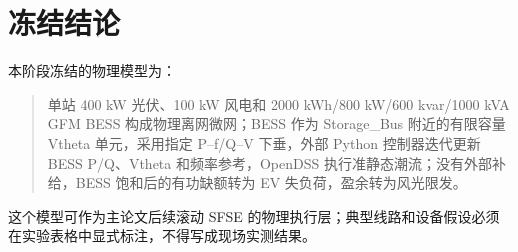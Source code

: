 \documentclass[UTF8,a4paper,11pt]{ctexart}
\begin{document}
\section{冻结结论}

本阶段冻结的物理模型为：

\begin{quote}
单站 400 kW 光伏、100 kW 风电和 2000 kWh/800 kW/600 kvar/1000 kVA GFM BESS 构成物理离网微网；BESS 作为 Storage\_Bus 附近的有限容量 Vtheta 单元，采用指定 P--f/Q--V 下垂，外部 Python 控制器迭代更新 BESS P/Q、Vtheta 和频率参考，OpenDSS 执行准静态潮流；没有外部补给，BESS 饱和后的有功缺额转为 EV 失负荷，盈余转为风光限发。
\end{quote}

这个模型可作为主论文后续滚动 SFSE 的物理执行层；典型线路和设备假设必须在实验表格中显式标注，不得写成现场实测结果。
\end{document}
